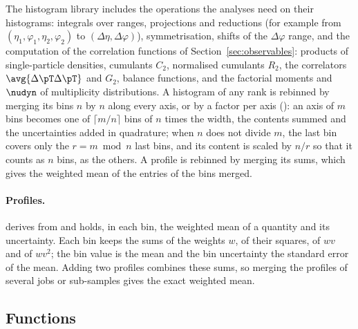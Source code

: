 The histogram library includes the operations the analyses need on their histograms: integrals over ranges,
projections and reductions (for example from $(\eta_1,\varphi_1,\eta_2,\varphi_2)$ to $(\Delta\eta,\Delta\varphi)$), symmetrisation, shifts of the $\Delta\varphi$ range, and the computation of the correlation functions of Section~\ref{sec:observables}: products of single-particle densities, cumulants $C_2$, normalised cumulants $R_2$, the correlators $\avg{\Delta\pT\Delta\pT}$ and $G_2$, balance functions, and the factorial moments and $\nudyn$ of multiplicity distributions. A histogram of any rank is rebinned by merging its bins $n$ by $n$ along every axis, or by a factor per axis
(): an axis of $m$ bins becomes one of $\lceil m/n\rceil$ bins of $n$ times the width, the
contents summed and the uncertainties added in quadrature; when $n$ does not divide $m$, the last bin covers only the
$r = m \bmod n$ last bins, and its content is scaled by $n/r$ so that it counts as $n$ bins, as the others. A profile
is rebinned by merging its sums, which gives the weighted mean of the entries of the bins merged.

\paragraph{Profiles.}
 derives from  and holds, in each bin, the weighted mean of a quantity and its
uncertainty. Each bin keeps the sums of the weights $w$, of their squares, of $w v$ and of $w v^2$; the bin value is
the mean and the bin uncertainty the standard error of the mean. Adding two profiles combines these sums, so
merging the profiles of several jobs or sub-samples gives the exact weighted mean.

\subsection{Functions}
\label{sec:functions}

